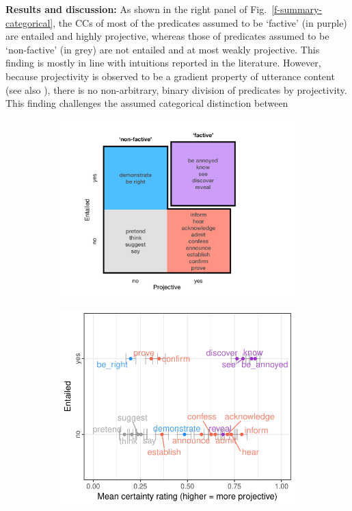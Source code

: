 \documentclass[12pt,fleqn]{article}
\newcommand{\6}{\mbox{$[\hspace*{-.6mm}[$}}
\newcommand{\9}{\mbox{$]\hspace*{-.6mm}]$}}
\begin{document}
{\bf Results and discussion:} As shown in the right panel of Fig.\ \ref{f-summary-categorical}, the CCs of most of the predicates assumed to be `factive' (in purple) are entailed and highly projective, whereas those of predicates assumed to be `non-factive' (in grey) are not entailed and at most weakly projective. This finding is mostly in line with intuitions reported in the literature. However, because projectivity is observed to be a gradient property of utterance content (see also \cite{tbd-variability}), there is no non-arbitrary, binary division of predicates by projectivity. This finding challenges the assumed categorical distinction between \vspace{-1.15em}
\begin{figure}
\begin{subfigure}{.35\textwidth}
\centering
\includegraphics[width=.27\paperwidth]{../paper/figures/categorization}
\end{subfigure} %
\begin{subfigure}{.3\textwidth}
\centering
\includegraphics[width=.3\paperwidth]{../results/5-projectivity-no-fact/graphs/projection-by-inferenceEntailment}
\end{subfigure}


\end{figure}
\end{document}
